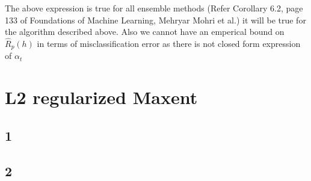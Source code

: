 \documentclass{article}
\begin{document}
The above expression is true for all ensemble methods (Refer Corollary 6.2, page 133 of Foundations of Machine Learning, Mehryar Mohri et al.) it will be true for the algorithm described above.  Also we cannot have an emperical bound on $\hat{R}_p(h)$ in terms of misclassification error as there is not closed form expression of $\alpha_{t}$

\newpage

\section*{L2 regularized Maxent}
\subsection*{1}
\subsection*{2}
\end{document}
